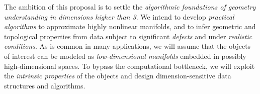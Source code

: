 \documentclass[a4paper, 11pt]{article}
\begin{document}

The ambition of this proposal is to settle the {\em algorithmic
foundations of geometry understanding in 
dimensions higher than 3}.  We intend to develop {\em practical algorithms} to approximate
highly nonlinear manifolds, and to infer geometric and topological
properties from data subject to significant {\em defects} and under
{\em realistic conditions}. 
%
As is common in many applications, we will assume that  the objects of
interest can be modeled as {\em low-dimensional manifolds} 
embedded in possibly high-dimensional spaces.
To  bypass the computational bottleneck, we will 
exploit the {\em intrinsic properties} of the objects and design
dimension-sensitive data structures and algorithms.%
\end{document}
